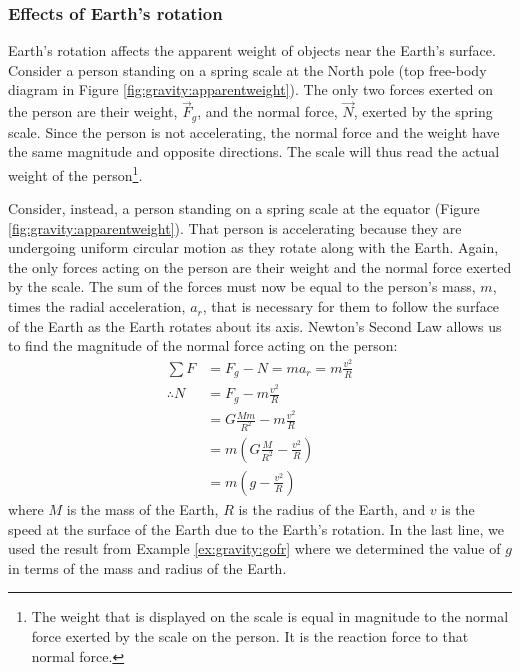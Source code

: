 \subsubsection{Effects of Earth's rotation}
Earth's rotation affects the apparent weight of objects near the Earth's surface. Consider a person standing on a spring scale at the North pole (top free-body diagram in Figure \ref{fig:gravity:apparentweight}). The only two forces exerted on the person are their weight, $\vec F_g$, and the normal force, $\vec N$, exerted by the spring scale. Since the person is not accelerating, the normal force and the weight have the same magnitude and opposite directions. The scale will thus read the actual weight of the person\footnote{The weight that is displayed on the scale is equal in magnitude to the normal force exerted by the scale on the person. It is the reaction force to that normal force.}.


Consider, instead, a person standing on a spring scale at the equator (Figure \ref{fig:gravity:apparentweight}). That person is accelerating because they are undergoing uniform circular motion as they rotate along with the Earth. Again, the only forces acting on the person are their weight and the normal force exerted by the scale. The sum of the forces must now be equal to the person's mass, $m$, times the radial acceleration, $a_r$, that is necessary for them to follow the surface of the Earth as the Earth rotates about its axis. Newton's Second Law allows us to find the magnitude of the normal force acting on the person:
\begin{align*}
\sum F &= F_g-N=ma_r=m\frac{v^2}{R}\\
\therefore N &= F_g - m\frac{v^2}{R}\\
&=G\frac{Mm}{R^2} -  m\frac{v^2}{R}\\
&=m\left(G\frac{M}{R^2} - \frac{v^2}{R}  \right)\\
&=m\left(g - \frac{v^2}{R}  \right)
\end{align*}
where $M$ is the mass of the Earth, $R$ is the radius of the Earth, and $v$ is the speed at the surface of the Earth due to the Earth's rotation.  In the last line, we used the result from Example \ref{ex:gravity:gofr} where we determined the value of $g$ in terms of the mass and radius of the Earth.

